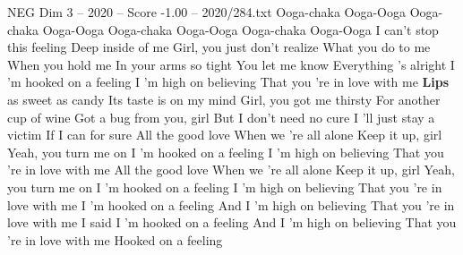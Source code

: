 \begin{textsample}{NEG Dim 3 – 2020 – Score -1.00 – 2020/284.txt}  \label{ex:f3_neg_035}
Ooga-chaka Ooga-Ooga Ooga-chaka Ooga-Ooga Ooga-chaka Ooga-Ooga Ooga-chaka Ooga-Ooga I can't stop this feeling Deep inside of me Girl, you just don't realize What you do to me When you hold me In your arms so tight You let me know Everything 's alright I 'm hooked on a feeling I 'm high on believing That you 're in love with me \textbf{Lips} as sweet as candy Its taste is on my mind Girl, you got me thirsty For another cup of wine Got a bug from you, girl But I don't need no cure I 'll just stay a victim If I can for sure All the good love When we 're all alone Keep it up, girl Yeah, you turn me on I 'm hooked on a feeling I 'm high on believing That you 're in love with me All the good love When we 're all alone Keep it up, girl Yeah, you turn me on I 'm hooked on a feeling I 'm high on believing That you 're in love with me I 'm hooked on a feeling And I 'm high on believing That you 're in love with me I said I 'm hooked on a feeling And I 'm high on believing That you 're in love with me Hooked on a feeling

\end{textsample}
